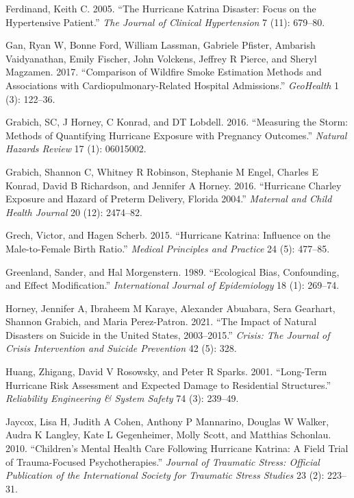 \documentclass[
]{article}
\begin{document}
\leavevmode\hypertarget{ref-ferdinand2005hurricane}{}%
Ferdinand, Keith C. 2005. ``The Hurricane Katrina Disaster: Focus on the
Hypertensive Patient.'' \emph{The Journal of Clinical Hypertension} 7
(11): 679--80.

\leavevmode\hypertarget{ref-gan2017comparison}{}%
Gan, Ryan W, Bonne Ford, William Lassman, Gabriele Pfister, Ambarish
Vaidyanathan, Emily Fischer, John Volckens, Jeffrey R Pierce, and Sheryl
Magzamen. 2017. ``Comparison of Wildfire Smoke Estimation Methods and
Associations with Cardiopulmonary-Related Hospital Admissions.''
\emph{GeoHealth} 1 (3): 122--36.

\leavevmode\hypertarget{ref-grabich2016measuring}{}%
Grabich, SC, J Horney, C Konrad, and DT Lobdell. 2016. ``Measuring the
Storm: Methods of Quantifying Hurricane Exposure with Pregnancy
Outcomes.'' \emph{Natural Hazards Review} 17 (1): 06015002.

\leavevmode\hypertarget{ref-grabich2016hurricane}{}%
Grabich, Shannon C, Whitney R Robinson, Stephanie M Engel, Charles E
Konrad, David B Richardson, and Jennifer A Horney. 2016. ``Hurricane
Charley Exposure and Hazard of Preterm Delivery, Florida 2004.''
\emph{Maternal and Child Health Journal} 20 (12): 2474--82.

\leavevmode\hypertarget{ref-grech2015hurricane}{}%
Grech, Victor, and Hagen Scherb. 2015. ``Hurricane Katrina: Influence on
the Male-to-Female Birth Ratio.'' \emph{Medical Principles and Practice}
24 (5): 477--85.

\leavevmode\hypertarget{ref-greenland1989ecological}{}%
Greenland, Sander, and Hal Morgenstern. 1989. ``Ecological Bias,
Confounding, and Effect Modification.'' \emph{International Journal of
Epidemiology} 18 (1): 269--74.

\leavevmode\hypertarget{ref-horney2021impact}{}%
Horney, Jennifer A, Ibraheem M Karaye, Alexander Abuabara, Sera
Gearhart, Shannon Grabich, and Maria Perez-Patron. 2021. ``The Impact of
Natural Disasters on Suicide in the United States, 2003--2015.''
\emph{Crisis: The Journal of Crisis Intervention and Suicide Prevention}
42 (5): 328.

\leavevmode\hypertarget{ref-huang2001long}{}%
Huang, Zhigang, David V Rosowsky, and Peter R Sparks. 2001. ``Long-Term
Hurricane Risk Assessment and Expected Damage to Residential
Structures.'' \emph{Reliability Engineering \& System Safety} 74 (3):
239--49.

\leavevmode\hypertarget{ref-jaycox2010children}{}%
Jaycox, Lisa H, Judith A Cohen, Anthony P Mannarino, Douglas W Walker,
Audra K Langley, Kate L Gegenheimer, Molly Scott, and Matthias Schonlau.
2010. ``Children's Mental Health Care Following Hurricane Katrina: A
Field Trial of Trauma-Focused Psychotherapies.'' \emph{Journal of
Traumatic Stress: Official Publication of the International Society for
Traumatic Stress Studies} 23 (2): 223--31.
\end{document}
